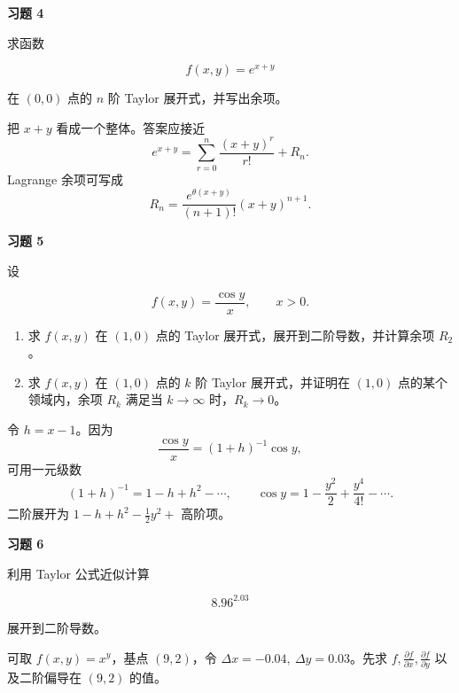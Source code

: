 \begin{exercisebox}
\textbf{习题 4}

求函数

\[
        f(x,y)=e^{x+y}
      \]

在 \((0,0)\) 点的 \(n\) 阶 Taylor 展开式，并写出余项。

\begin{hintbox}
把 \(x+y\) 看成一个整体。答案应接近 \[
          e^{x+y}=\sum_{r=0}^{n}\frac{(x+y)^r}{r!}+R_n.
        \] Lagrange 余项可写成 \[
          R_n=\frac{e^{\theta(x+y)}}{(n+1)!}(x+y)^{n+1}.
        \]
\end{hintbox}
\end{exercisebox}

\begin{exercisebox}
\textbf{习题 5}

设

\[
        f(x,y)=\frac{\cos y}{x},\qquad x>0.
      \]

\begin{enumerate}
 \item 求 \(f(x,y)\) 在 \((1,0)\) 点的 Taylor 展开式，展开到二阶导数，并计算余项 \(R_2\)。
 \item 求 \(f(x,y)\) 在 \((1,0)\) 点的 \(k\) 阶 Taylor 展开式，并证明在 \((1,0)\) 点的某个领域内，余项 \(R_k\) 满足当 \(k\to\infty\) 时，\(R_k\to0\)。
 \end{enumerate}

\begin{hintbox}
令 \(h=x-1\)。因为 \[
          \frac{\cos y}{x}=(1+h)^{-1}\cos y,
        \] 可用一元级数 \[
          (1+h)^{-1}=1-h+h^2-\cdots,\qquad
          \cos y=1-\frac{y^2}{2}+\frac{y^4}{4!}-\cdots.
        \] 二阶展开为 \(1-h+h^2-\frac12y^2+\) 高阶项。
\end{hintbox}
\end{exercisebox}

\begin{exercisebox}
\textbf{习题 6}

利用 Taylor 公式近似计算

\[
        8.96^{2.03}
      \]

展开到二阶导数。

\begin{hintbox}
可取 \(f(x,y)=x^y\)，基点 \((9,2)\)，令 \(\Delta x=-0.04,\ \Delta y=0.03\)。先求 \(f,\frac{\partial f}{\partial x},\frac{\partial f}{\partial y}\) 以及二阶偏导在 \((9,2)\) 的值。
\end{hintbox}
\end{exercisebox}

